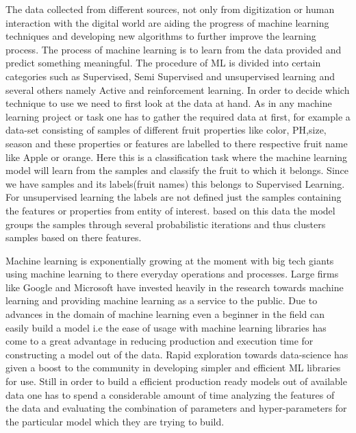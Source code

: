 The data collected from different sources, not only from digitization or human interaction with the digital world are aiding the progress of machine learning techniques and developing new algorithms to further improve the learning process. The process of machine learning is to learn from the data provided and predict something meaningful. The procedure of ML is divided into certain categories such as Supervised, Semi Supervised and unsupervised learning and several others namely Active and reinforcement learning. In order to decide which technique to use we need to first look at the data at hand. As in any machine learning project or task one has to gather the required data at first, for example a data-set consisting of samples of different fruit properties like color, PH,size, season and these properties or features are labelled to there respective fruit name like Apple or orange. Here this is a classification task where the machine learning model will learn from the samples and classify the fruit to which it belongs. Since we have samples and its labels(fruit names) this belongs to Supervised Learning. For unsupervised learning the labels are not defined just the samples containing the features or properties from entity of interest. based on this data the model groups the samples through several probabilistic iterations and thus clusters samples based on there features.


Machine learning is exponentially growing at the moment with big tech giants using machine learning to there everyday operations and processes. Large firms like Google and Microsoft have invested heavily in the research towards machine learning and providing machine learning as a service to the public. Due to advances in the domain of machine learning even a beginner in the field can easily build a model i.e the ease of usage with machine learning libraries has come to a great advantage in reducing production and execution time for constructing a model out of the data. Rapid exploration towards data-science has given a boost to the community in developing simpler and efficient ML libraries for use. Still in order to build a efficient production ready models out of available data one has to spend a considerable amount of time analyzing the features of the data and evaluating the combination of parameters and hyper-parameters for the particular model which they are trying to build. 

